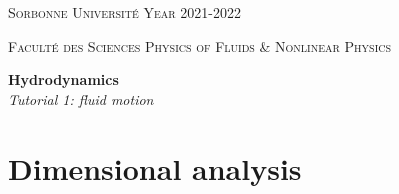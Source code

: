 \documentclass[11pt,a4paper]{article}
\begin{document}
\setlength{\unitlength}{1cm}
\noindent
\parbox{\textwidth}{
\textsc{
Sorbonne Université  
\hfill
Year 2021-2022
}
}
\parbox{\textwidth}{
\textsc{
Faculté des Sciences
\hfill
Physics of Fluids \& Nonlinear Physics
}
}

\begin{center}
\Large
\textbf{Hydrodynamics} \\ 
\textsl{Tutorial 1: fluid motion} \\[1ex]
\end{center}

\section{Dimensional analysis}
\togglefalse{corrige}
\end{document}
